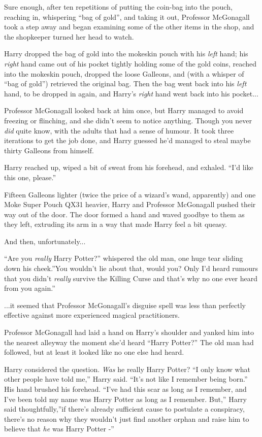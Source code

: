 Sure enough, after ten repetitions of putting the coin-bag into the
pouch, reaching in, whispering ``bag of gold'', and taking it out,
Professor McGonagall took a step away and began examining some of the
other items in the shop, and the shopkeeper turned her head to watch.

Harry dropped the bag of gold into the mokeskin pouch with his
\emph{left} hand; his \emph{right} hand came out of his pocket tightly
holding some of the gold coins, reached into the mokeskin pouch, dropped
the loose Galleons, and (with a whisper of ``bag of gold'') retrieved
the original bag. Then the bag went back into his \emph{left} hand, to
be dropped in again, and Harry's \emph{right} hand went back into his
pocket...

Professor McGonagall looked back at him once, but Harry managed to avoid
freezing or flinching, and she didn't seem to notice anything. Though
you never \emph{did} quite know, with the adults that had a sense of
humour. It took three iterations to get the job done, and Harry guessed
he'd managed to steal maybe thirty Galleons from himself.

Harry reached up, wiped a bit of sweat from his forehead, and exhaled.
``I'd like this one, please.''

Fifteen Galleons lighter (twice the price of a wizard's wand,
apparently) and one Moke Super Pouch QX31 heavier, Harry and Professor
McGonagall pushed their way out of the door. The door formed a hand and
waved goodbye to them as they left, extruding its arm in a way that made
Harry feel a bit queasy.

And then, unfortunately...

``Are you \emph{really} Harry Potter?'' whispered the old man, one huge
tear sliding down his cheek.''You wouldn't lie about that, would you?
Only I'd heard rumours that you didn't \emph{really} survive the Killing
Curse and that's why no one ever heard from you again.''

...it seemed that Professor McGonagall's disguise spell was less
than perfectly effective against more experienced magical practitioners.

Professor McGonagall had laid a hand on Harry's shoulder and yanked him
into the nearest alleyway the moment she'd heard ``Harry Potter?'' The
old man had followed, but at least it looked like no one else had heard.

Harry considered the question. \emph{Was} he really Harry Potter? ``I
only know what other people have told me,'' Harry said. ``It's not like
I remember being born.'' His hand brushed his forehead. ``I've had this
scar as long as I remember, and I've been told my name was Harry Potter
as long as I remember. But,'' Harry said thoughtfully,''if there's
already sufficient cause to postulate a conspiracy, there's no reason
why they wouldn't just find another orphan and raise him to believe that
\emph{he} was Harry Potter -''

